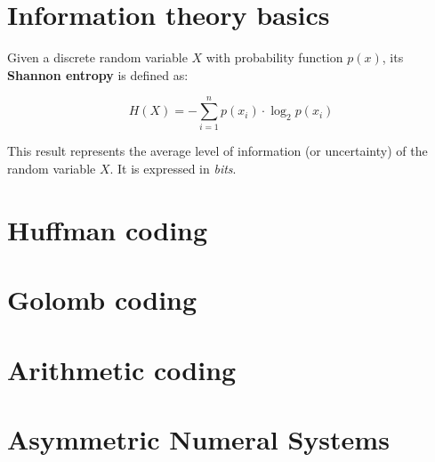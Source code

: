 \section{Information theory basics}
Given a discrete random variable $X$ with probability function $p(x)$, its \textbf{Shannon entropy} is defined as:

\begin{equation}
H(X) = - \sum_{i=1}^{n} p(x_i) \cdot \log_2 p(x_i) 
\end{equation}

This result represents the average level of information (or uncertainty) of the random variable $X$. It is expressed in \textit{bits}.

\section{Huffman coding}

\section{Golomb coding}

\section{Arithmetic coding}

\section{Asymmetric Numeral Systems}

